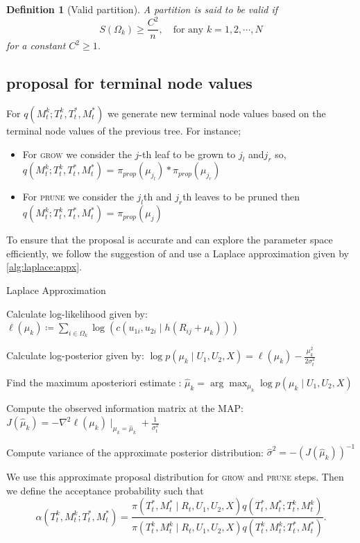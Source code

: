 \documentclass{amsart}
\newtheorem{definition}{Definition}[section]
\begin{document}
\begin{definition}[Valid partition]
	A partition is said to be valid if
	\begin{equation*}
		S(\Omega_k) \ge \frac{C^2}{n}, \quad\text{for any } k=1,2,\cdots, N
	\end{equation*}
	for a constant $C^2\ge 1$.
\end{definition}

\subsection{proposal for terminal node values}
For $q\left(M_t^k;T_t^k, T_t^\ast, M_t^\ast\right)$ we generate new terminal node values based on the terminal node values of the previous tree. For instance;

\begin{itemize}
	\item For \textsc{grow} we consider the $j$-th leaf to be grown to $j_l$ and$j_r$ so,
	$q\left(M_t^k;T_t^k, T_t^\ast, M_t^\ast\right)$ = $\pi_{prop}(\mu_{j_l})*\pi_{prop}(\mu_{j_r})$
	\item For \textsc{prune} we consider the $j_l$th and $j_r$th leaves to be pruned then $q\left(M_t^k;T_t^k, T_t^\ast, M_t^\ast\right)$ = $\pi_{prop}(\mu_j)$
\end{itemize}
To ensure that the proposal is accurate and can explore the parameter space efficiently, we follow the suggestion of \citet{Linero02012025} and use a Laplace approximation given by \cref{alg:laplace:appx}.

\begin{algorithm}[H]
	\caption{Laplace Approximation}\label{alg:laplace:appx}
	\begin{algorithmic}[1]
		\State Calculate log-likelihood given by: $\ell(\mu_k)\coloneqq\sum_{i\in \Omega_k}\log\left(c\left(u_{1i},u_{2i}\mid h\left(R_{ij}+\mu_k\right)\right)\right)$
		
		\State Calculate log-posterior given by: $\log p(\mu_k\mid U_1,U_2, X) = \ell(\mu_k) - \frac{\mu_k^2}{2\sigma_{t}^2}$
		
		\State Find the maximum aposteriori estimate : $\hat{\mu}_k = \arg\max_{\mu_k}\log p(\mu_k\mid U_1,U_2, X)$
		
		\State Compute the observed information matrix at the MAP:
		$J(\hat{\mu}_k) = -\nabla^2\ell(\mu_k)\mid_{\mu_k = \hat{\mu}_k}+\frac{1}{\sigma_t^2}$
		
		\State Compute variance of the approximate posterior distribution: $\hat{\sigma}^2 = -(J(\hat{\mu}_k))^{-1}$
		
	\end{algorithmic}
\end{algorithm}
We use this approximate proposal distribution for \textsc{grow} and \textsc{prune} steps. Then we define the acceptance probability such that
\begin{equation}\label{eq:acc:prob}
	\alpha\left(T_t^k,M_t^k;T_t^\ast, M_t^\ast\right)
	= \frac{\pi(T_t^\ast,M_t^\ast \mid R_t, U_1, U_2, X)q\left(T_t^\ast, M_t^\ast;T_t^k,M_t^k\right)}
	{\pi(T_t^k,M_t^k \mid R_t, U_1, U_2, X)q\left(T_t^k,M_t^k;T_t^\ast, M_t^\ast\right)}.
\end{equation}
\end{document}

